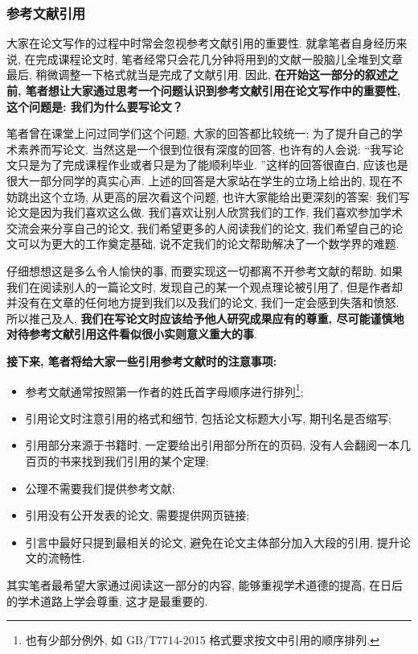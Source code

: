 \documentclass{booki}
\begin{document}
\subsubsection{参考文献引用}
大家在论文写作的过程中时常会忽视参考文献引用的重要性. 就拿笔者自身经历来说, 在完成课程论文时, 笔者经常只会花几分钟将用到的文献一股脑儿全堆到文章最后, 稍微调整一下格式就当是完成了文献引用. 因此, \textbf{在开始这一部分的叙述之前, 笔者想让大家通过思考一个问题认识到参考文献引用在论文写作中的重要性, 这个问题是: 我们为什么要写论文？}\par
笔者曾在课堂上问过同学们这个问题, 大家的回答都比较统一: 为了提升自己的学术素养而写论文. 当然这是一个很到位很有深度的回答, 也许有的人会说: {``}我写论文只是为了完成课程作业或者只是为了能顺利毕业. ''这样的回答很直白, 应该也是很大一部分同学的真实心声. 上述的回答是大家站在学生的立场上给出的, 现在不妨跳出这个立场, 从更高的层次看这个问题, 也许大家能给出更深刻的答案: 我们写论文是因为我们喜欢这么做. 我们喜欢让别人欣赏我们的工作, 我们喜欢参加学术交流会来分享自己的论文, 我们希望更多的人阅读我们的论文, 我们希望自己的论文可以为更大的工作奠定基础, 说不定我们的论文帮助解决了一个数学界的难题. \par
仔细想想这是多么令人愉快的事, 而要实现这一切都离不开参考文献的帮助. 如果我们在阅读别人的一篇论文时, 发现自己的某一个观点理论被引用了, 但是作者却并没有在文章的任何地方提到我们以及我们的论文, 我们一定会感到失落和愤怒. 所以推己及人, \textbf{我们在写论文时应该给予他人研究成果应有的尊重, 尽可能谨慎地对待参考文献引用这件看似很小实则意义重大的事}. \par
{\textbf{接下来, 笔者将给大家一些引用参考文献时的注意事项:}}
\begin{itemize}
    \item {参考文献通常按照第一作者的姓氏首字母顺序进行排列\footnote{也有少部分例外, 如 GB/T7714-2015 格式要求按文中引用的顺序排列.}}{;}
    \item 引用论文时注意引用的格式和细节, 包括论文标题大小写, 期刊名是否缩写{;}
    \item 引用部分来源于书籍时, 一定要给出引用部分所在的页码, 没有人会翻阅一本几百页的书来找到我们引用的某个定理{;}
    \item 公理不需要我们提供参考文献{;}
    \item 引用没有公开发表的论文, 需要提供网页链接{;}
    \item 引言中最好只提到最相关的论文, 避免在论文主体部分加入大段的引用, 提升论文的流畅性{.}
\end{itemize}
\par
其实笔者最希望大家通过阅读这一部分的内容, 能够重视学术道德的提高, 在日后的学术道路上学会尊重, 这才是最重要的.
\end{document}
